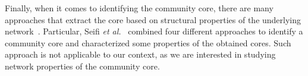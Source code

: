 Finally, when it comes to identifying the community core, there are many approaches that extract the core based on structural properties of the underlying
network~\cite{Leskovec@www2010,Chakrabarti:2006:EC:1150402.1150467,citeulike:370723,Sachan:2012}.  Particular, 
Seifi \textit{et al.}~\cite{Seifi:2012:CCE:2187980.2188258} combined four different
approaches to identify a community core and characterized some properties of the obtained cores. Such approach is not applicable to our context, as we are interested in studying
network properties of the community core. 


